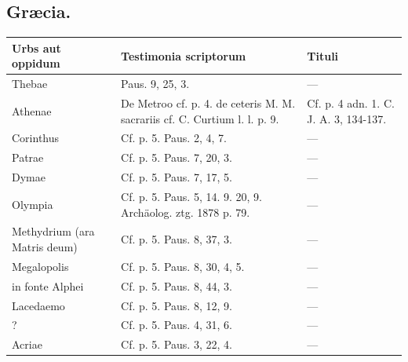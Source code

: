 \documentclass[a4paper, 11pt, oneside, polutonikogreek, german, twocolumn]{article}
\begin{document}
\subsection{Græcia.}
\begin{table}[H]
    \centering
    \begin{tabular}{|p{35mm}|p{60mm}|p{60mm}|}
    \hline
        \textbf{Urbs aut oppidum} & \textbf{Testimonia scriptorum} & \textbf{Tituli} \\ \hline
        Thebae & Paus. 9, 25, 3. & --- \\ \hline
        Athenae & De Metroo cf. p. 4. de ceteris M. M. sacrariis cf. C. Curtium l. l. p. 9. & Cf. p. 4 adn. 1. C. J. A. 3, 134-137. \\ \hline
        Corinthus & Cf. p. 5. Paus. 2, 4, 7. & --- \\ \hline
        Patrae & Cf. p. 5. Paus. 7, 20, 3. & --- \\ \hline
        Dymae & Cf. p. 5. Paus. 7, 17, 5. & --- \\ \hline
        Olympia & Cf. p. 5. Paus. 5, 14. 9. 20, 9. Archäolog. ztg. 1878 p. 79. & --- \\ \hline
        Methydrium (ara Matris deum) & Cf. p. 5. Paus. 8, 37, 3. & --- \\ \hline
        Megalopolis & Cf. p. 5. Paus. 8, 30, 4, 5. & --- \\ \hline
        in fonte Alphei & Cf. p. 5. Paus. 8, 44, 3. & --- \\ \hline
        Lacedaemo & Cf. p. 5. Paus. 8, 12, 9. & --- \\ \hline
        [Messene] ? & Cf. p. 5. Paus. 4, 31, 6. & --- \\ \hline
        Acriae & Cf. p. 5. Paus. 3, 22, 4. & --- \\ \hline
    \end{tabular}
\end{table}
\clearpage
\end{document}
